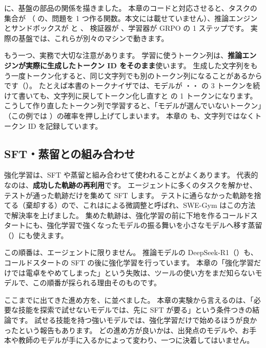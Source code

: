 に、基盤の部品の関係を描きました。
本章のコードと対応させると、タスクの集合が （ の、問題を 1 つ作る関数。本文には載せていません）、推論エンジンとサンドボックスが  と 、
検証器が 、学習器が GRPO の 1 ステップです。
実際の基盤では、これらが別々のマシンで動きます。

もう一つ、実務で大切な注意があります。
学習に使うトークン列は、\textbf{推論エンジンが実際に生成したトークン ID をそのまま}使います。
生成した文字列をもう一度トークン化すると、同じ文字列でも別のトークン列になることがあるからです（）。
たとえば本書のトークナイザでは、モデルが ・・ の 3 トークンを続けて書いても、文字列に戻してトークン化し直すと  の 1 トークンになります。
こうして作り直したトークン列で学習すると、「モデルが選んでいないトークン」（この例では ）の確率を押し上げてしまいます。
本章の  も、文字列ではなくトークン ID を記録しています。

\subsection{SFT・蒸留との組み合わせ}

強化学習は、SFT や蒸留と組み合わせて使われることがよくあります。
代表的なのは、\textbf{成功した軌跡の再利用}です。
エージェントに多くのタスクを解かせ、テストが通った軌跡だけを集めて SFT します。
テストに通らなかった軌跡を捨てる（棄却する）ので、これはによる微調整と呼ばれ、SWE-Gym はこの方法で解決率を上げました\cite{pan2025swegym}。
集めた軌跡は、強化学習の前に下地を作るコールドスタートにも、強化学習で強くなったモデルの振る舞いを小さなモデルへ移す蒸留（）にも使えます。

この順番は、エージェントに限りません。
推論モデルの DeepSeek-R1（）も、コールドスタートの SFT の後に強化学習を行っています\cite{guo2025deepseekr1}。
本章の「強化学習だけでは電卓をやめてしまった」という失敗は、ツールの使い方をまだ知らないモデルで、この順番が採られる理由そのものです。

ここまでに出てきた進め方を、に並べました。
本章の実験から言えるのは、「必要な技能を探索で試せないモデルでは、先に SFT が要る」という条件つきの結論です。
試せる技能を持つ強いモデルでは、強化学習だけで始めるほうが良かったという報告もあります。
どの進め方が良いかは、出発点のモデルや、お手本や教師のモデルが手に入るかによって変わり、一つに決着してはいません。

